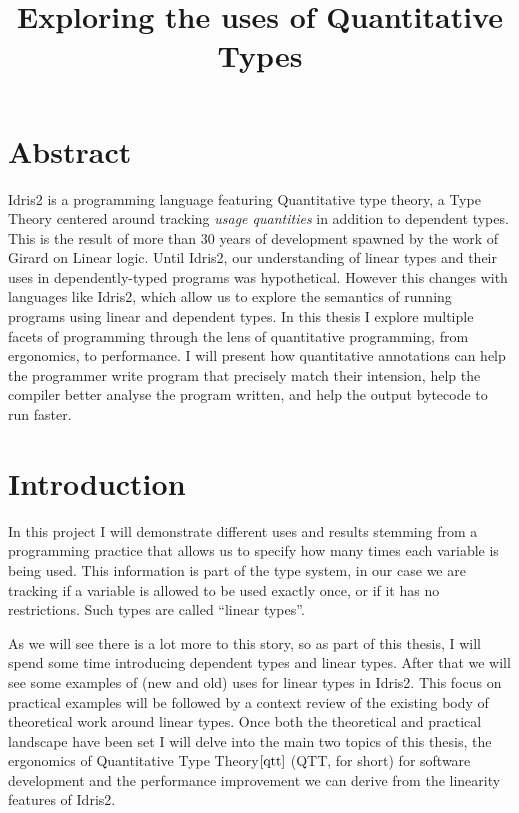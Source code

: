 \documentclass[
]{article}
\author{}
\date{}
\begin{document}
\title{Exploring the uses of Quantitative Types}
\maketitle

\hypertarget{abstract}{%
\section{Abstract}\label{abstract}}

Idris2 is a programming language featuring Quantitative type
theory\cite{qtt}, a Type Theory centered around tracking \emph{usage
quantities} in addition to dependent types. This is the result of more
than 30 years of development spawned by the work of Girard on Linear
logic\cite{linear-logic}. Until Idris2, our understanding of linear
types and their uses in dependently-typed programs was hypothetical.
However this changes with languages like Idris2, which allow us to
explore the semantics of running programs using linear and dependent
types. In this thesis I explore multiple facets of programming through
the lens of quantitative programming, from ergonomics, to performance. I
will present how quantitative annotations can help the programmer write
program that precisely match their intension, help the compiler better
analyse the program written, and help the output bytecode to run faster.

\newpage
\setcounter{secnumdepth}{1}
\tableofcontents
\newpage

\hypertarget{introduction}{%
\section{Introduction}\label{introduction}}

In this project I will demonstrate different uses and results stemming
from a programming practice that allows us to specify how many times
each variable is being used. This information is part of the type
system, in our case we are tracking if a variable is allowed to be used
exactly once, or if it has no restrictions. Such types are called
``linear types''.

As we will see there is a lot more to this story, so as part of this
thesis, I will spend some time introducing dependent types and linear
types. After that we will see some examples of (new and old) uses for
linear types in Idris2. This focus on practical examples will be
followed by a context review of the existing body of theoretical work
around linear types. Once both the theoretical and practical landscape
have been set I will delve into the main two topics of this thesis, the
ergonomics of Quantitative Type Theory\(\cite{qtt}\) (QTT, for short)
for software development and the performance improvement we can derive
from the linearity features of Idris2.
\end{document}
